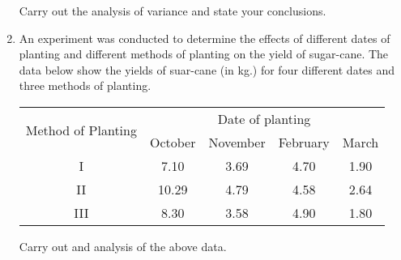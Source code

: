 \documentclass[11pt, a4paper]{article}
\begin{document}
\begin{enumerate}
\begin{table}[h]
	\end{table}
	
	Carry out the analysis of variance and state your conclusions.
	
	
	
	
	
	
\newpage
	
	
	
	\item An experiment was conducted to determine the effects of different dates of planting and different methods of planting on the yield of sugar-cane. The data below show the yields of suar-cane (in kg.) for four different dates and three methods of planting.
	
	\begin{table}[h]
	\def\arraystretch{1.5}
	
	\begin{center}
	\begin{tabular}{|c|c|c|c|c|}
	
	\hline
	
	\multirow{2}{*}{Method of Planting} & \multicolumn{4}{c|}{Date of planting} \\
	
	\hhline{~----}
	
	& October & November & February & March \\
	
	\hline
	
	I & 7.10 & 3.69 & 4.70 & 1.90 \\
	
	II & 10.29 & 4.79 & 4.58 & 2.64 \\
	
	III & 8.30 & 3.58 & 4.90 & 1.80 \\
	
	\hline
	
	\end{tabular}
	\end{center}
	
	\end{table}
	
	Carry out and analysis of the above data.
\end{enumerate}
\end{document}
